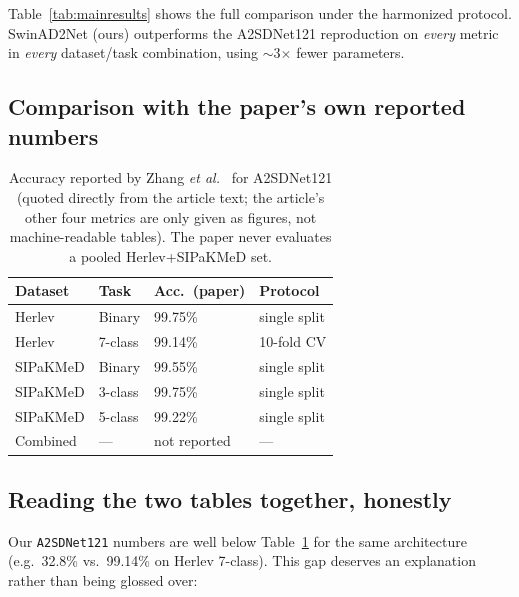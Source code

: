 \documentclass[10pt,twocolumn]{article}
\newcommand{\code}[1]{\texttt{\small #1}}
\begin{document}
Table~\ref{tab:mainresults} shows the full comparison under the harmonized protocol. SwinAD2Net (ours) outperforms the A2SDNet121 reproduction on \emph{every} metric in \emph{every} dataset/task combination, using $\sim$3$\times$ fewer parameters.

\subsection{Comparison with the paper's own reported numbers}

\begin{table}[H]
\centering\small
\begin{tabular}{@{}llll@{}}
\toprule
\textbf{Dataset} & \textbf{Task} & \textbf{Acc.\ (paper)} & \textbf{Protocol} \\
\midrule
Herlev & Binary & 99.75\% & single split \\
Herlev & 7-class & 99.14\% & 10-fold CV \\
SIPaKMeD & Binary & 99.55\% & single split \\
SIPaKMeD & 3-class & 99.75\% & single split \\
SIPaKMeD & 5-class & 99.22\% & single split \\
Combined & --- & not reported & --- \\
\bottomrule
\end{tabular}
\caption{Accuracy reported by Zhang \emph{et al.}~\cite{zhang2025} for A2SDNet121 (quoted directly from the article text; the article's other four metrics are only given as figures, not machine-readable tables). The paper never evaluates a pooled Herlev+SIPaKMeD set.}
\label{tab:paperresults}
\end{table}

\subsection{Reading the two tables together, honestly}

Our \code{A2SDNet121} numbers are well below Table~\ref{tab:paperresults} for the same architecture (e.g.\ 32.8\% vs.\ 99.14\% on Herlev 7-class). This gap deserves an explanation rather than being glossed over:
\end{document}
